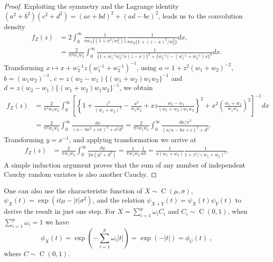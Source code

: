 \documentclass[lineno]{biometrika}
\begin{document}
\begin{proof}
Exploiting the symmetry and the Lagrange identity $(a^2 + b^2)(c^2 + d^2) = (ac+bd)^2 + (ad-bc)^2$, leads us to the convolution density
\begin{align*} 
f_Z(z) & = 2 \int_{0}^{\infty} \frac{1}{ \pi w_1 \{ (1+ x^2/w_1^2) \} } \frac{1}{\pi w_2 \{1+ (z-x)^2/w_2^2 \} } dx, \\
& = \frac{2}{\pi^2 w_1 w_2} \int_{0}^{\infty} \frac{1}{ \{1+ w_1^{-1} w_2^{-1} x (z-x) \}^2 + \{w_2^{-1}z - (w_1^{-1}+ w_2^{-1}) x \}^2 } dx.
\end{align*}
Transforming $x \mapsto x + w_2^{-1}z (w_1^{-1} + w_2^{-1})^{-1}$, 
using $a = 1 + z^2(w_1+w_2)^{-2}$, $b =(w_1w_2)^{-1}$, 
$c= z (w_2-w_1) \{(w_1+w_2) w_1 w_2\}^{-1}$ and 
$d = z (w_2-w_1)\{(w_1+w_2) w_1 w_2\}^{-1}$, we obtain
\begin{align*}
  f_Z(z) &= \frac{2}{\pi^2 w_1 w_2} \int_{0}^{\infty} 
  \left[ 
    \left\{ 1 + \frac{z^2}{(w_1+w_2)^2} - \frac{x^2}{w_1w_2} + 
      xz \frac{w_2-w_1}{(w_1+w_2) w_1 w_2} \right\}^2 + 
    x^2 \left(\frac{w_1 + w_2}{w_1w_2} \right)^2 
  \right]^{-1} dx 
  \\
  &= \frac{2}{\pi^2 w_1 w_2} \int_{0}^{\infty} 
  \frac{dx}{\left( a - b x^2 + cx \right)^2 + x^2 d^2} 
  = \frac{2}{\pi^2 w_1 w_2} \int_{0}^{\infty} 
  \frac{dx/x^2}{\left(a/x - bx + c \right)^2 + d^2 }.
\end{align*}
Transforming $y = x^{-1}$, and applying \CS{} transformation we arrive at 
\begin{align*}
  f_Z(z) &= \frac{2}{\pi w_1 w_2} \int_{0}^{\infty} \frac{dy}{2a (y^2 + d^2)} 
  = \frac{1}{\pi w_1 w_2} \frac{1}{ad} 
  = \frac{1}{\pi (w_1+w_2)} \frac{1}{1+ z^2/(w_1+w_2)^2}.
\end{align*}
A simple induction argument proves that the sum of any number of independent
Cauchy random variates is also another Cauchy.
\end{proof}

One can also use the characteristic function of $X \sim \operatorname{C}(\mu, \sigma)$,
$\psi_X(t) = \exp(it \mu - |t| \sigma^2)$, and the relation 
$\psi_{X+Y}(t) = \psi_X(t) \psi_Y(t)$ to derive the result in just one step.  
For $X = \sum_{i=1}^{p} \omega_i C_i$ and $C_i \sim \operatorname{C}(0,1)$, 
when $\sum_{i=1}^{p} \omega_i = 1$ we have 
$$
\phi_X(t) = \exp\left(-\sum_{i=1}^{p}\omega_i |t|\right) = \exp(-|t|) = \phi_C(t)
\;,
$$ 
where $C \sim \operatorname{C}(0,1)$. 
\end{document}
